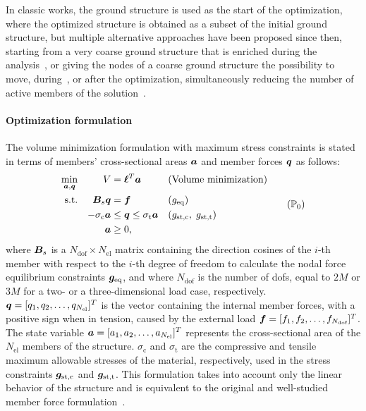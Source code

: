 In classic works, the ground structure is used as the start of the optimization, where the optimized structure is obtained as a subset of the initial ground structure, but multiple alternative approaches have been proposed since then, \eg starting from a very coarse ground structure that is enriched during the analysis~, or giving the nodes of a coarse ground structure the possibility to move, during~, or after the optimization, simultaneously reducing the number of active members of the solution~.

\paragraph{Optimization formulation}
The volume minimization formulation with maximum stress constraints is stated in terms of members' cross-sectional areas $\bm{a}$ and member forces $\bm{q}$ as follows:
\begin{equation}
    \begin{aligned}
    \min_{\vect{a}, \vect{q}}   && V &= \vect{\ell}^{T}\vect{a} && \textrm{(Volume minimization)}\\
    \textrm{s.t.}   && \matr{B}_s\vect{q} &= \vect{f} && (g_\text{eq})\\
    && -\sigma_\text{c}\vect{a} &\leq \vect{q} \leq \sigma_\text{t}\vect{a} && (g_\text{st,c}, \; g_\text{st,t}) \\
    && \vect{a} &\geq 0, \\
    \end{aligned}
    \tag{$\mathbb{P}_0$}
    \label{eq:03_optim_original}
\end{equation}
where $\bm{B}_s$ is a $N_{\text{dof}} \times N_{\text{el}}$ matrix containing the direction cosines of the $i$-th member with respect to the $i$-th degree of freedom to calculate the nodal force equilibrium constraints $\bm{g}_\text{eq}$, and where $N_{\text{dof}}$ is the number of \gls{dofs}, equal to $2M$ or $3M$ for a two- or a three-dimensional load case, respectively. $\bm{q} = [q_1, q_2, \ldots,q_{N_{\text{el}}}]^T$ is the vector containing the internal member forces, with a positive sign when in tension, caused by the external load $\bm{f} = [f_1, f_2, \ldots,f_{N_{\text{dof}}}]^T$. The state variable $\bm{a} = [a_1, a_2, \ldots,a_{N_{\text{el}}}]^T$ represents the cross-sectional area of the $N_{\text{el}}$ members of the structure. $\sigma_\text{c}$ and $\sigma_\text{t}$ are the compressive and tensile maximum allowable stresses of the material, respectively, used in the stress constraints $\bm{g}_\text{st,c}$ and $\bm{g}_\text{st,t}$. This formulation takes into account only the linear behavior of the structure and is equivalent to the original and well-studied member force formulation~.

